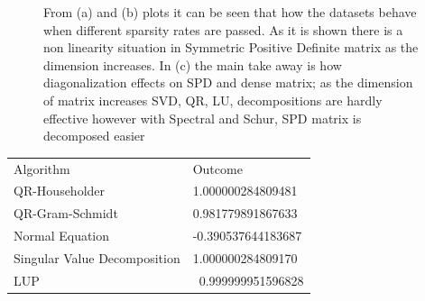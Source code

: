 \documentclass[]{finalproject}
\begin{document}
\begin{flushleft}
\begin{figure}[!h]
\centering   
{}
\caption{From (a) and (b) plots it can be seen that how the datasets behave when different sparsity rates are passed. As it is shown there is a non linearity situation in Symmetric Positive Definite matrix as the dimension increases. In (c) the main take away is how diagonalization effects on SPD and dense matrix; as the dimension of matrix increases SVD, QR, LU, decompositions are hardly effective however with Spectral and Schur, SPD matrix is decomposed easier}
\end{figure}


\begin{table}[!h]
\centering
\begin{tabular}{ll}
\textcolor[rgb]{0.141,0.161,0.184}{Algorithm}                    & Outcome                                                 \\
\textcolor[rgb]{0.141,0.161,0.184}{QR-Householder}               & \textcolor[rgb]{0.133,0.133,0.133}{1.000000284809481}   \\
\textcolor[rgb]{0.141,0.161,0.184}{QR-Gram-Schmidt}              & \textcolor[rgb]{0.133,0.133,0.133}{0.981779891867633}   \\
\textcolor[rgb]{0.141,0.161,0.184}{Normal Equation}                     & \textcolor[rgb]{0.133,0.133,0.133}{-0.390537644183687}  \\
\textcolor[rgb]{0.141,0.161,0.184}{Singular Value Decomposition} & \textcolor[rgb]{0.133,0.133,0.133}{1.000000284809170}   \\
\textcolor[rgb]{0.141,0.161,0.184}{LUP}                          & \textcolor[rgb]{0.133,0.133,0.133}{~0.999999951596828} 
\end{tabular}


\end{table}
\end{flushleft}
\end{document}
